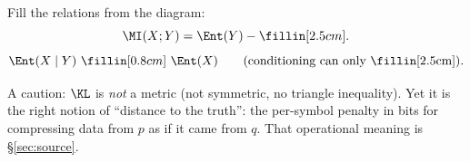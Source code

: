 \begin{yourturn}
Fill the relations from the diagram:
\[ \MI(X;Y)=\Ent(Y)-\fillin[2.5cm]. \]
\[ \Ent(X\mid Y)\ \fillin[0.8cm]\ \Ent(X)\qquad(\text{conditioning can only \fillin[2.5cm]}). \]
\end{yourturn}

\begin{strand}
A caution: $\KL$ is \emph{not} a metric (not symmetric, no triangle inequality). Yet it is the
right notion of ``distance to the truth'': the per-symbol penalty in bits for compressing data
from $p$ as if it came from $q$. That operational meaning is §\ref{sec:source}.
\end{strand}
